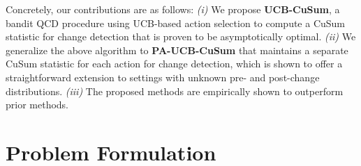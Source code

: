 \documentclass[letterpaper, 10 pt, conference]{ieeeconf}  %
\begin{document}


Concretely, our contributions are as follows: \textit{(i)} We propose \textbf{UCB-CuSum}, a bandit QCD procedure using UCB-based action selection to compute a CuSum statistic for change detection that is proven to be asymptotically optimal. \textit{(ii)}     We generalize the above algorithm to \textbf{PA-UCB-CuSum} that maintains a separate CuSum statistic for each action for change detection, which is shown to offer a straightforward extension to settings with unknown pre- and post-change distributions. \textit{(iii)} The proposed methods are empirically shown to outperform prior methods.


\section{Problem Formulation}
\label{sec:problem_form}
\end{document}
